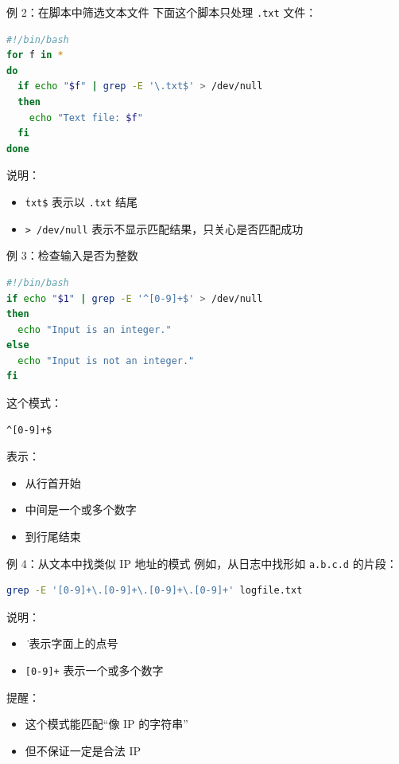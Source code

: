 \documentclass[aspectratio=169]{beamer}
\begin{document}
\begin{frame}[fragile]{例 2：在脚本中筛选文本文件}
下面这个脚本只处理 \texttt{.txt} 文件：

\begin{lstlisting}[language=bash]
#!/bin/bash
for f in *
do
  if echo "$f" | grep -E '\.txt$' > /dev/null
  then
    echo "Text file: $f"
  fi
done
\end{lstlisting}

说明：
\begin{itemize}
  \item \texttt{\.txt\$} 表示以 \texttt{.txt} 结尾
  \item \texttt{> /dev/null} 表示不显示匹配结果，只关心是否匹配成功
\end{itemize}
\end{frame}

\begin{frame}[fragile]{例 3：检查输入是否为整数}
\begin{lstlisting}[language=bash]
#!/bin/bash
if echo "$1" | grep -E '^[0-9]+$' > /dev/null
then
  echo "Input is an integer."
else
  echo "Input is not an integer."
fi
\end{lstlisting}

这个模式：
\begin{lstlisting}[language=bash]
^[0-9]+$
\end{lstlisting}

表示：
\begin{itemize}
  \item 从行首开始
  \item 中间是一个或多个数字
  \item 到行尾结束
\end{itemize}
\end{frame}

\begin{frame}[fragile]{例 4：从文本中找类似 IP 地址的模式}
例如，从日志中找形如 \texttt{a.b.c.d} 的片段：

\begin{lstlisting}[language=bash]
grep -E '[0-9]+\.[0-9]+\.[0-9]+\.[0-9]+' logfile.txt
\end{lstlisting}

说明：
\begin{itemize}
  \item \texttt{\.} 表示字面上的点号
  \item \texttt{[0-9]+} 表示一个或多个数字
\end{itemize}

\vspace{0.5em}
提醒：
\begin{itemize}
  \item 这个模式能匹配“像 IP 的字符串”
  \item 但不保证一定是合法 IP
\end{itemize}
\end{frame}
\end{document}
